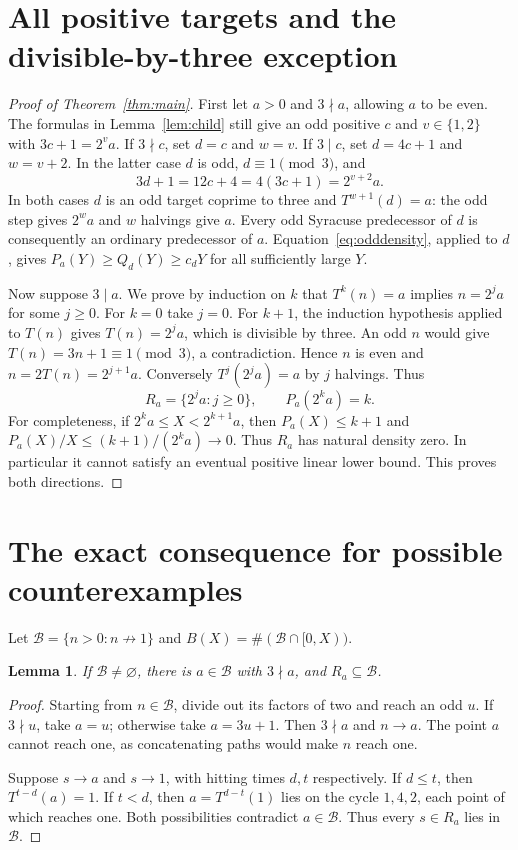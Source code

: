 \documentclass[11pt]{article}
\newtheorem{lemma}[theorem]{Lemma}
\begin{document}
\section{All positive targets and the divisible-by-three exception}
\begin{proof}[Proof of Theorem~\ref{thm:main}]
First let $a>0$ and $3\nmid a$, allowing $a$ to be even.
The formulas in Lemma~\ref{lem:child} still give an odd positive $c$ and
$v\in\{1,2\}$ with $3c+1=2^v a$. If $3\nmid c$, set $d=c$ and $w=v$.
If $3\mid c$, set $d=4c+1$ and $w=v+2$. In the latter case $d$ is odd,
$d\equiv1\pmod3$, and
\[
 3d+1=12c+4=4(3c+1)=2^{v+2}a.
\]
In both cases $d$ is an odd target coprime to three and
$T^{w+1}(d)=a$: the odd step gives $2^w a$ and $w$ halvings give $a$.
Every odd Syracuse predecessor of $d$ is consequently an ordinary
predecessor of $a$. Equation~\eqref{eq:odddensity}, applied to $d$, gives
$P_a(Y)\ge Q_d(Y)\ge c_dY$ for all sufficiently large $Y$.

Now suppose $3\mid a$. We prove by induction on $k$ that
$T^k(n)=a$ implies $n=2^j a$ for some $j\ge0$.
For $k=0$ take $j=0$. For $k+1$, the induction hypothesis applied
to $T(n)$ gives $T(n)=2^j a$, which is divisible by three.
An odd $n$ would give $T(n)=3n+1\equiv1\pmod3$, a contradiction.
Hence $n$ is even and $n=2T(n)=2^{j+1}a$.
Conversely $T^j(2^ja)=a$ by $j$ halvings. Thus
\begin{equation}\label{eq:exception}
 R_a=\{2^ja:j\ge0\},\qquad P_a(2^ka)=k.
\end{equation}
For completeness, if $2^ka\le X<2^{k+1}a$, then
$P_a(X)\le k+1$ and
$P_a(X)/X\le(k+1)/(2^ka)\to0$. Thus $R_a$ has natural density zero.
In particular it cannot satisfy an eventual positive linear lower bound.
This proves both directions.
\end{proof}

\section{The exact consequence for possible counterexamples}
Let $\mathcal B=\{n>0:n\not\longrightarrow1\}$ and
$B(X)=\#(\mathcal B\cap[0,X))$.
\begin{lemma}\label{lem:bad}
If $\mathcal B\ne\varnothing$, there is $a\in\mathcal B$ with
$3\nmid a$, and $R_a\subseteq\mathcal B$.
\end{lemma}
\begin{proof}
Starting from $n\in\mathcal B$, divide out its factors of two and reach
an odd $u$. If $3\nmid u$, take $a=u$; otherwise take $a=3u+1$.
Then $3\nmid a$ and $n\longrightarrow a$. The point $a$ cannot reach one,
as concatenating paths would make $n$ reach one.

Suppose $s\longrightarrow a$ and $s\longrightarrow1$, with hitting
times $d,t$ respectively. If $d\le t$, then $T^{t-d}(a)=1$.
If $t<d$, then $a=T^{d-t}(1)$ lies on the cycle $1,4,2$, each point
of which reaches one. Both possibilities contradict $a\in\mathcal B$.
Thus every $s\in R_a$ lies in $\mathcal B$.
\end{proof}
\end{document}
